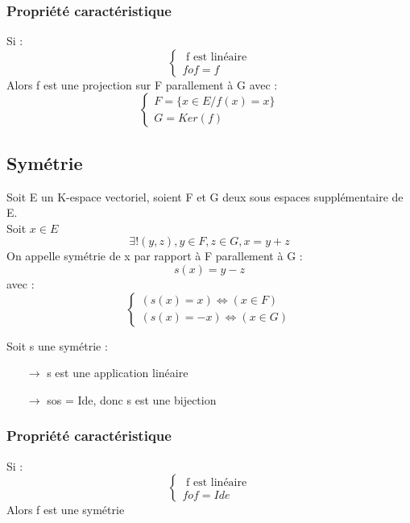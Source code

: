 \subsubsection{Propriété caractéristique}
\begin{prop}
Si : 
$$\left\{\begin{array}{l}
   \mbox{ f est linéaire}\\
   fof = f
  \end{array}\right.$$
Alors f est une projection sur F parallement à G avec :
$$\left\{\begin{array}{l}
   F = \{ x\in E / f(x) = x\}\\
  G = Ker(f)
  \end{array}\right.$$
\end{prop}
\subsection{Symétrie}
\begin{de}
Soit E un K-espace vectoriel, soient F et G deux sous espaces supplémentaire de E.\\
Soit $x \in E$
$$\exists !(y,z), y\in F, z\in G, x=y+z$$
On appelle symétrie de x par rapport à F parallement à G :
$$s(x) = y-z$$
avec :
$$\left\{\begin{array}{l}
   (s(x) = x ) \Leftrightarrow ( x \in F)\\
   (s(x) = -x) \Leftrightarrow ( x \in G)
  \end{array}\right.$$
\end{de}
\begin{prop}
Soit s une symétrie :
\begin{itemize}
 \item[$\rightarrow$] s est une application linéaire
 \item[$\rightarrow$] sos = Ide, donc s est une bijection
\end{itemize}
\end{prop}
\subsubsection{Propriété caractéristique}
\begin{prop}
 Si : 
$$\left\{\begin{array}{l}
   \mbox{ f est linéaire}\\
   fof = Ide
  \end{array}\right.$$
Alors f est une symétrie
\end{prop}

